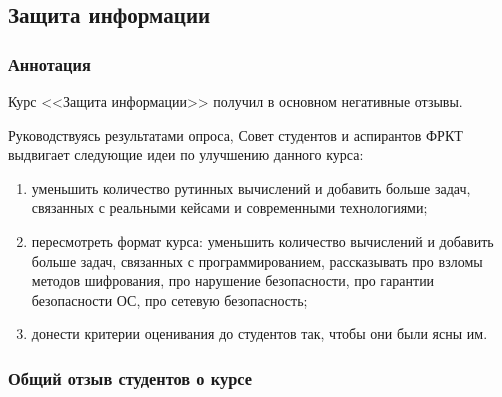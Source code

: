 \subsection{Защита информации}
	
	\subsubsection{Аннотация}

        Курс <<Защита информации>> получил в основном негативные отзывы. 
        
        Руководствуясь результатами опроса, Совет студентов и аспирантов ФРКТ выдвигает следующие идеи по улучшению данного курса:
        \begin{enumerate}
            \item уменьшить количество рутинных вычислений и добавить больше задач, связанных с реальными кейсами и современными технологиями;
            \item пересмотреть формат курса: уменьшить количество вычислений и добавить больше задач, связанных с программированием, рассказывать про взломы методов шифрования, про нарушение безопасности, про гарантии безопасности ОС, про сетевую безопасность;
            \item донести критерии оценивания до студентов так, чтобы они были ясны им.
        \end{enumerate}

	\subsubsection{Общий отзыв студентов о курсе}

